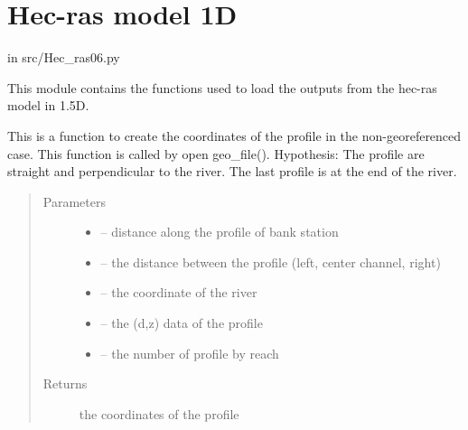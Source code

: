 \documentclass[letterpaper,10pt,english]{sphinxmanual}
\begin{document}
\section{Hec-ras model 1D}
\label{\detokenize{index:hec-ras-model-1d}}
in src/Hec\_ras06.py

This module contains the functions used to load the outputs from the hec-ras model in 1.5D.
\label{\detokenize{index:module-src.Hec_ras06}}

\begin{fulllineitems}
\label{\detokenize{index:src.Hec_ras06.coord_profile_non_georeferenced}}
This is a function to create the coordinates of the profile in the non-georeferenced case.
This function is called by open geo\_file(). Hypothesis: The profile are straight and perpendicular to the river.
The last profile is at the end of the river.
\begin{quote}\begin{description}
\item[{Parameters}] \leavevmode\begin{itemize}
\item {} 
 -- distance along the profile of bank station

\item {} 
 -- the distance between the profile (left, center channel, right)

\item {} 
 -- the coordinate of the river

\item {} 
 -- the (d,z) data of the profile

\item {} 
 -- the number of profile by reach

\end{itemize}

\item[{Returns}] \leavevmode
the coordinates of the profile

\end{description}\end{quote}


\end{fulllineitems}
\end{document}
